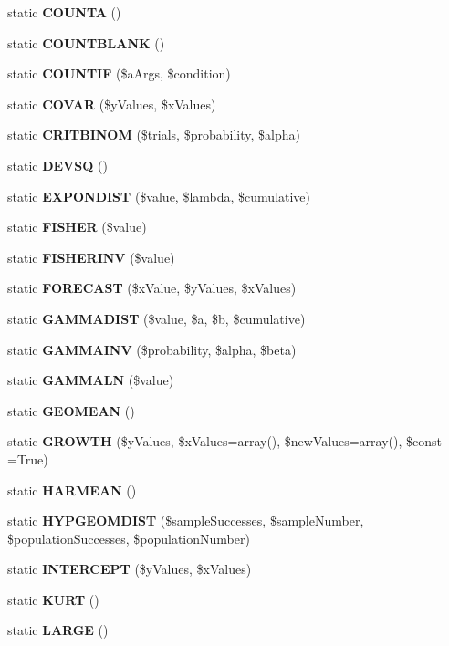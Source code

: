 \begin{DoxyCompactItemize}
\item 
static {\bfseries C\+O\+U\+N\+T\+A} ()\label{class_p_h_p_excel___calculation___statistical_a32e969809da449d56a68710306a91327}

\item 
static {\bfseries C\+O\+U\+N\+T\+B\+L\+A\+N\+K} ()\label{class_p_h_p_excel___calculation___statistical_a37f626d1ad9adf03fa44f8f64d3fc733}

\item 
static {\bfseries C\+O\+U\+N\+T\+I\+F} (\$a\+Args, \$condition)\label{class_p_h_p_excel___calculation___statistical_a86f3642ecc8c7b833bf74bc596a3805b}

\item 
static {\bf C\+O\+V\+A\+R} (\$y\+Values, \$x\+Values)
\item 
static {\bf C\+R\+I\+T\+B\+I\+N\+O\+M} (\$trials, \$probability, \$alpha)
\item 
static {\bfseries D\+E\+V\+S\+Q} ()\label{class_p_h_p_excel___calculation___statistical_a2431bc60f9b1f272c6c0865e6818d4f8}

\item 
static {\bf E\+X\+P\+O\+N\+D\+I\+S\+T} (\$value, \$lambda, \$cumulative)
\item 
static {\bf F\+I\+S\+H\+E\+R} (\$value)
\item 
static {\bf F\+I\+S\+H\+E\+R\+I\+N\+V} (\$value)
\item 
static {\bf F\+O\+R\+E\+C\+A\+S\+T} (\$x\+Value, \$y\+Values, \$x\+Values)
\item 
static {\bf G\+A\+M\+M\+A\+D\+I\+S\+T} (\$value, \$a, \$b, \$cumulative)
\item 
static {\bf G\+A\+M\+M\+A\+I\+N\+V} (\$probability, \$alpha, \$beta)
\item 
static {\bf G\+A\+M\+M\+A\+L\+N} (\$value)
\item 
static {\bfseries G\+E\+O\+M\+E\+A\+N} ()\label{class_p_h_p_excel___calculation___statistical_aa11000689ba1f11fd93e7e638f50e4b5}

\item 
static {\bf G\+R\+O\+W\+T\+H} (\$y\+Values, \$x\+Values=array(), \$new\+Values=array(), \$const =True)
\item 
static {\bfseries H\+A\+R\+M\+E\+A\+N} ()\label{class_p_h_p_excel___calculation___statistical_ac00aca79371901f71b4a1209a4e83070}

\item 
static {\bf H\+Y\+P\+G\+E\+O\+M\+D\+I\+S\+T} (\$sample\+Successes, \$sample\+Number, \$population\+Successes, \$population\+Number)
\item 
static {\bf I\+N\+T\+E\+R\+C\+E\+P\+T} (\$y\+Values, \$x\+Values)
\item 
static {\bf K\+U\+R\+T} ()
\item 
static {\bfseries L\+A\+R\+G\+E} ()\label{class_p_h_p_excel___calculation___statistical_a592458a9fd2c97373febddd3d5967e58}


\end{DoxyCompactItemize}
